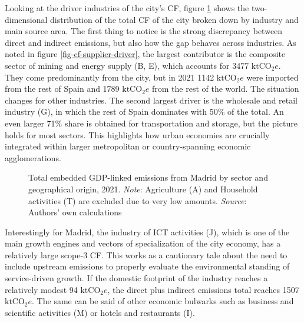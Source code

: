 \documentclass[
  10pt,
  twocolumn]{aft}
\begin{document}
Looking at the driver industries of the city's CF, figure
\ref{fig-cf-sector-source} shows the two-dimensional distribution of the
total CF of the city broken down by industry and main source area. The
first thing to notice is the strong discrepancy between direct and
indirect emissions, but also how the gap behaves across industries. As
noted in figure \ref{fig-cf-supplier-driver}, the largest contributor is
the composite sector of mining and energy supply (B, E), which accounts
for 3477 \(\text{ktCO}_2e\). They come predominantly from the city, but
in 2021 1142 \(\text{ktCO}_2e\) were imported from the rest of Spain and
1789 \(\text{ktCO}_2e\) from the rest of the world. The situation
changes for other industries. The second largest driver is the wholesale
and retail industry (G), in which the rest of Spain dominates with 50\%
of the total. An even larger 71\% share is obtained for transportation
and storage, but the picture holds for most sectors. This highlights how
urban economies are crucially integrated within larger metropolitan or
country-spanning economic agglomerations.

\begin{figure}[!ht]


\caption{\label{fig-cf-sector-source}Total embedded GDP-linked emissions
from Madrid by sector and geographical origin, 2021. \emph{Note}:
Agriculture (A) and Household activities (T) are excluded due to very
low amounts. \emph{Source}: Authors' own calculations}

\end{figure}%

Interestingly for Madrid, the industry of ICT activities (J), which is
one of the main growth engines and vectors of specialization of the city
economy, has a relatively large scope-3 CF. This works as a cautionary
tale about the need to include upstream emissions to properly evaluate
the environmental standing of service-driven growth. If the domestic
footprint of the industry reaches a relatively modest 94
\(\text{ktCO}_2e\), the direct plus indirect emissions total reaches
1507 \(\text{ktCO}_2e\). The same can be said of other economic bulwarks
such as business and scientific activities (M) or hotels and restaurants
(I).
\end{document}
